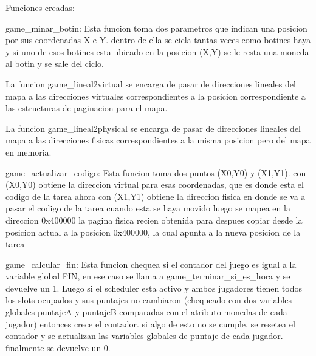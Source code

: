   Funciones creadas:

    game_minar_botin:
      Esta funcion toma dos parametros que indican una posicion por sus coordenadas X e Y.
      dentro de ella se cicla tantas veces como botines haya y si uno de esos botines esta ubicado en la
      posicion (X,Y) se le resta una moneda al botin y se sale del ciclo.

    La funcion game_lineal2virtual se encarga de pasar de direcciones lineales del mapa a las direcciones
    virtuales correspondientes a la posicion correspondiente a las estructuras de paginacion para el mapa.

    La funcion game_lineal2physical se encarga de pasar de direcciones lineales del mapa a las direcciones
    fisicas correspondientes a la misma posicion pero del mapa en memoria.

    game_actualizar_codigo:
      Esta funcion toma dos puntos (X0,Y0) y (X1,Y1).
      con (X0,Y0) obtiene la direccion virtual para esas coordenadas, que es donde esta el codigo de la tarea ahora
      con (X1,Y1) obtiene la direccion fisica en donde se va a pasar el codigo de la tarea cuando esta se haya movido
      luego se mapea en la direccion 0x400000 la pagina fisica recien obtenida
      para despues copiar desde la posicion actual a la posicion 0x400000, la cual apunta a la nueva posicion de la tarea

    game_calcular_fin:
      Esta funcion chequea si el contador del juego es igual a la variable global FIN, en ese caso se llama a game_terminar_si_es_hora
      y se devuelve un 1.
      Luego si el scheduler esta activo y ambos jugadores tienen todos los slots ocupados y sus puntajes no cambiaron
      (chequeado con dos variables globales puntajeA y puntajeB comparadas con el atributo monedas de cada jugador)
      entonces crece el contador.
      si algo de esto no se cumple, se resetea el contador y se actualizan las variables globales de puntaje de cada jugador.
      finalmente se devuelve un 0.
